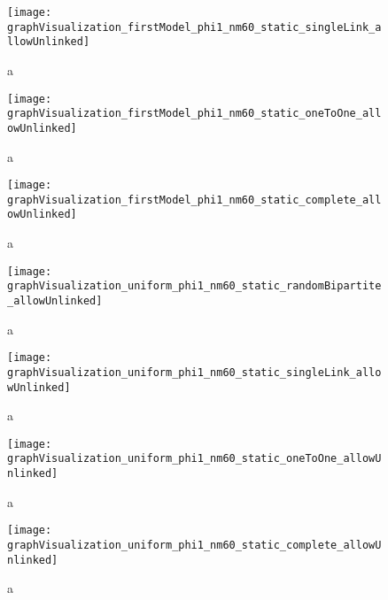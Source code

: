 \begin{figure}
  \centering
  \texttt{[image: graphVisualization\_firstModel\_phi1\_nm60\_static\_singleLink\_allowUnlinked]}
  \caption{a}
  \label{fig:graphVisualization_firstModel_phi1_nm60_static_singleLink_allowUnlinked}
\end{figure}

\begin{figure}
  \centering
  \texttt{[image: graphVisualization\_firstModel\_phi1\_nm60\_static\_oneToOne\_allowUnlinked]}
  \caption{a}
  \label{fig:graphVisualization_firstModel_phi1_nm60_static_oneToOne_allowUnlinked}
\end{figure}

\begin{figure}
  \centering
  \texttt{[image: graphVisualization\_firstModel\_phi1\_nm60\_static\_complete\_allowUnlinked]}
  \caption{a}
  \label{fig:graphVisualization_firstModel_phi1_nm60_static_complete_allowUnlinked}
\end{figure}

\begin{figure}
  \centering
  \texttt{[image: graphVisualization\_uniform\_phi1\_nm60\_static\_randomBipartite\_allowUnlinked]}
  \caption{a}
  \label{fig:graphVisualization_uniform_phi1_nm60_static_randomBipartite_allowUnlinked}
\end{figure}

\begin{figure}
  \centering
  \texttt{[image: graphVisualization\_uniform\_phi1\_nm60\_static\_singleLink\_allowUnlinked]}
  \caption{a}
  \label{fig:graphVisualization_uniform_phi1_nm60_static_singleLink_allowUnlinked}
\end{figure}

\begin{figure}
  \centering
  \texttt{[image: graphVisualization\_uniform\_phi1\_nm60\_static\_oneToOne\_allowUnlinked]}
  \caption{a}
  \label{fig:graphVisualization_uniform_phi1_nm60_static_oneToOne_allowUnlinked}
\end{figure}

\begin{figure}
  \centering
  \texttt{[image: graphVisualization\_uniform\_phi1\_nm60\_static\_complete\_allowUnlinked]}
  \caption{a}
  \label{fig:graphVisualization_uniform_phi1_nm60_static_complete_allowUnlinked}
\end{figure}


